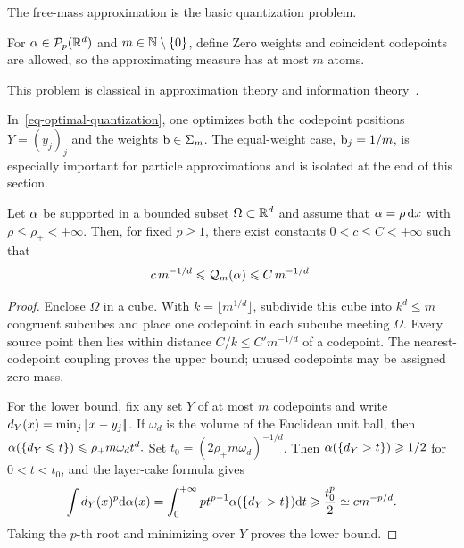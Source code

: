 The free-mass approximation is the basic quantization problem.
\begin{defn}\label{def-optimal-quantization}
For $\alpha\in\mathcal{P}_p(\mathbb{R}^d)$ and $m\in\mathbb{N}\setminus\{0\}$, define
Zero weights and coincident codepoints are allowed, so the approximating measure has at most $m$ atoms.
\end{defn}
This problem is classical in approximation theory and information theory~\cite{graf2000foundationsquantization,Lloyd82}.

In~\eqref{eq-optimal-quantization}, one optimizes both the codepoint positions $Y=(y_j)_j$ and the weights $\mathrm{b}\in\Sigma_m$. The equal-weight case, $\mathrm{b}_j=1/m$, is especially important for particle approximations and is isolated at the end of this section.

\begin{prop}\label{prop-quantization-rate}
	Let $\alpha$ be supported in a bounded subset $\Omega\subset\mathbb{R}^d$ and assume that $\alpha=\rho\,\mathrm{d} x$ with $\rho\leq\rho_+<+\infty$. Then, for fixed $p\geq1$, there exist constants $0<c\leq C<+\infty$ such that
	\[
		c\,m^{-1/d}
		\leqslant
		\mathcal{Q}_m(\alpha)
		\leqslant
		C\,m^{-1/d}.
	\]
\end{prop}
\begin{proof}
	Enclose $\Omega$ in a cube. With $k=\lfloor m^{1/d}\rfloor$, subdivide this cube into $k^d\leq m$ congruent subcubes and place one codepoint in each subcube meeting $\Omega$. Every source point then lies within distance $C/k\leq C'm^{-1/d}$ of a codepoint. The nearest-codepoint coupling proves the upper bound; unused codepoints may be assigned zero mass.

	For the lower bound, fix any set $Y$ of at most $m$ codepoints and write $d_Y(x)=\min_j|\!| x-y_j |\!|$. If $\omega_d$ is the volume of the Euclidean unit ball, then
	\(
	\alpha(\{d_Y\leqslant t\})\leqslant \rho_+m\omega_dt^d.
	\)
	Set $t_0=(2\rho_+m\omega_d)^{-1/d}$. Then $\alpha(\{d_Y>t\})\geqslant1/2$ for $0<t<t_0$, and the layer-cake formula gives
	\[
		\int d_Y(x)^p\mathrm{d}\alpha(x)
		=
		\int_0^{+\infty} p t^{p-1}\alpha(\{d_Y>t\})\mathrm{d} t
		\geqslant
		\frac{t_0^p}{2}
		\simeq
		c m^{-p/d}.
	\]
	Taking the $p$-th root and minimizing over $Y$ proves the lower bound.
\end{proof}

